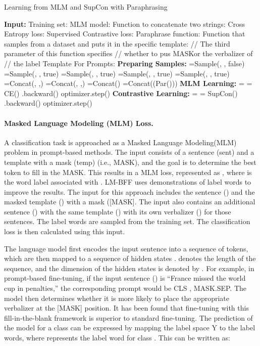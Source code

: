\documentclass[11pt]{article}
\begin{document}
\begin{algorithm}[!ht]
  \caption{Learning from MLM and SupCon with Paraphrasing}
  \label{alg:mlm-supcon}
  \begin{algorithmic}[1]
    \State \textbf{Input:}
    \State Training set: 
    \State MLM model: 
    \State Function to concatenate two strings: 
    \State Cross Entropy loss: 
    \State Supervised Contrastive loss: 
    \State Paraphrase function:  
    \State Function that samples from a dataset and puts it in the specific template: 
    \State // The third parameter of this function specifies
    \State // whether to pus \lbrack MASK\rbrack or the verbalizer of
    \State // the label
    \State Template For Prompts: 
    \State 
    \State \textbf{Preparing Samples:}
        \State =Sample(, , false)
        \State =Sample(, , true)
        \State =Sample(, , true)
        \State =Sample(, , true)
        \State =Sample(, , true)
        \State =Concat(, ,)
        \State =Concat(, ,)
        \State =Concat()
        \State =Concat((Par()))
        \State  \textbf{MLM Learning:}
        \State  = 
        \State  = CE()
        \State .backward()
        \State optimizer.step()
        \State  \textbf{Contrastive Learning:}
        \State  = 
        \State  = SupCon()
        \State .backward()
        \State optimizer.step()
    \EndFor
  \end{algorithmic}
\end{algorithm}


\paragraph{Masked Language Modeling (MLM) Loss.} A classification task is approached as a Masked Language Modeling(MLM) problem in prompt-based methods. The input consists of a sentence (sent) and a template with a mask (temp) (i.e., MASK), and the goal is to determine the best token to fill in the MASK. This results in a MLM loss, represented as , where  is the word label associated with . LM-BFF \cite{gao2021making} uses demonstrations of label words to improve the results. The input for this approach includes the sentence () and the masked template () with a mask ([MASK]. The input also contains an additional sentence () with the same template () with its own verbalizer () for those sentences. The label words are sampled from the training set. The classification loss is then calculated using this input.

The language model first encodes the input sentence  into a sequence of tokens, which are then mapped to a sequence of hidden states .  denotes the length of the sequence, and the dimension of the hidden states is denoted by . For example, in prompt-based fine-tuning, if the input sentence () is ``France missed the world cup in penalties,'' the corresponding prompt  would be CLS , MASK.SEP. The model then determines whether it is more likely to place the appropriate verbalizer at the [MASK] position. It has been found that fine-tuning with this fill-in-the-blank framework is superior to standard fine-tuning. The prediction of the model  for a class  can be expressed by mapping the label space Y to the label words, where  represents the label word for class . This can be written as:
\end{document}
